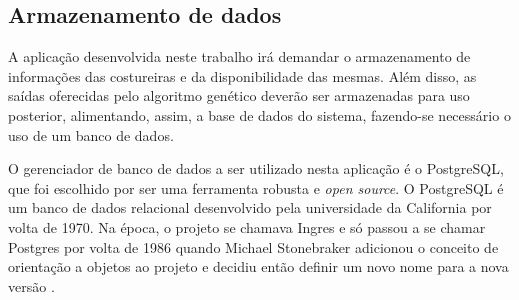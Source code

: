 % 
% 
% 
% 
% 


\subsection{Armazenamento de dados}

\par A aplicação desenvolvida neste trabalho irá demandar o armazenamento de
informações das costureiras e da disponibilidade das mesmas. Além disso, as saídas
oferecidas pelo algoritmo genético deverão ser armazenadas para uso posterior,
alimentando, assim, a base de dados do sistema, fazendo-se necessário o
uso de um banco de dados.

\par O gerenciador de banco de dados a ser utilizado nesta aplicação é o PostgreSQL, que 
foi escolhido por ser uma ferramenta robusta e \textit{open source}. O
PostgreSQL é um banco de dados relacional desenvolvido pela universidade da California por volta de 1970. Na
época, o projeto se chamava Ingres e só passou a se chamar Postgres por volta de 1986 quando Michael Stonebraker adicionou
o conceito de orientação a objetos ao projeto e decidiu então definir um novo
nome para a nova versão \cite{livro_postgres_doulgas}.

